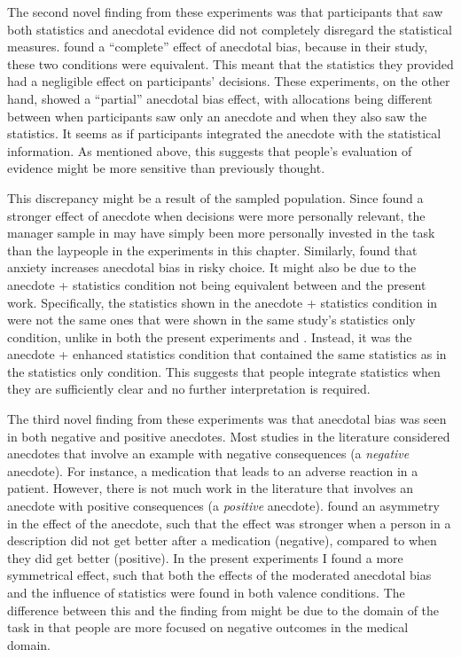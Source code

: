 \documentclass[a4paper, nobind, dvipsnames]{templates/ociamthesis}
\theoremstyle{definition}
\theoremstyle{definition}
\theoremstyle{definition}
\theoremstyle{definition}
\theoremstyle{remark}
\begin{document}
The second novel finding from these experiments was that participants that saw
both statistics and anecdotal evidence did not completely disregard the
statistical measures. \textcite{wainberg2013} found a ``complete'' effect of anecdotal bias,
because in their study, these two conditions were equivalent. This meant that
the statistics they provided had a negligible effect on participants' decisions.
These experiments, on the other hand, showed a ``partial'' anecdotal bias effect,
with allocations being different between when participants saw only an anecdote
and when they also saw the statistics. It seems as if participants integrated
the anecdote with the statistical information. As mentioned above, this suggests
that people's evaluation of evidence might be more sensitive than previously
thought.

This discrepancy might be a result of the sampled population. Since \textcite{freling2020}
found a stronger effect of anecdote when decisions were more personally
relevant, the manager sample in \textcite{wainberg2013} may have simply been more
personally invested in the task than the laypeople in the experiments in this
chapter. Similarly, \textcite{yang2015} found that anxiety increases anecdotal bias in
risky choice. It might also be due to the anecdote + statistics condition not
being equivalent between \textcite{wainberg2013} and the present work. Specifically, the
statistics shown in the anecdote + statistics condition in \textcite{wainberg2013} were
not the same ones that were shown in the same study's statistics only condition,
unlike in both the present experiments and \textcite{wainberg2018}. Instead, it was the
anecdote + enhanced statistics condition that contained the same statistics as
in the statistics only condition. This suggests that people integrate statistics
when they are sufficiently clear and no further interpretation is required.

The third novel finding from these experiments was that anecdotal bias was seen
in both negative and positive anecdotes. Most studies in the literature
considered anecdotes that involve an example with negative consequences (a
\emph{negative} anecdote). For instance, a medication that leads to an adverse
reaction in a patient. However, there is not much work in the literature that
involves an anecdote with positive consequences (a \emph{positive} anecdote).
\textcite{jaramillo2019} found an asymmetry in the effect of the anecdote, such that the
effect was stronger when a person in a description did not get better after a
medication (negative), compared to when they did get better (positive). In the
present experiments I found a more symmetrical effect, such that both the
effects of the moderated anecdotal bias and the influence of statistics were
found in both valence conditions. The difference between this and the finding
from \textcite{jaramillo2019} might be due to the domain of the task in that people are
more focused on negative outcomes in the medical domain.
\end{document}
